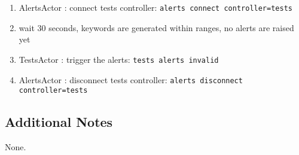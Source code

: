 \begin{enumerate}
    \item AlertsActor : connect tests controller: \texttt{alerts connect controller=tests}
    \item wait 30 seconds, keywords are generated within ranges, no alerts are raised yet
    \item TestsActor : trigger the alerts: \texttt{tests alerts invalid}
    \item AlertsActor : disconnect tests controller: \texttt{alerts disconnect controller=tests}
\end{enumerate}

\subsection{Additional Notes}
None.
